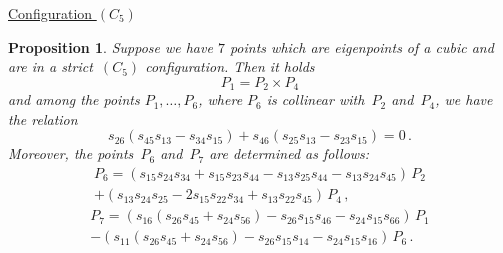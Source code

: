 \documentclass[a4paper, 11pt, reqno]{amsart}
\theoremstyle{plain}
\newtheorem{prop}[lemma]{Proposition}
\theoremstyle{definition}
\begin{document}
\underline{Configuration $(C_5)$}
\begin{prop}
\label{proposition:condition_5}
Suppose we have $7$ points which are eigenpoints of a cubic and are in a strict~$(C_5)$ configuration.
Then it holds
%
\[
  P_1 = P_2 \times P_4 
\]
%
and among the points $P_1, \dots, P_6$, where $P_6$ is collinear with~$P_2$ and~$P_4$, we have the relation
%
\begin{equation}
\label{cndC5}
  s_{26}(s_{45}s_{13}-s_{34}s_{15})+s_{46}(s_{25}s_{13}-s_{23}s_{15}) = 0 \,.
\end{equation}
%
Moreover, the points~$P_6$ and~$P_7$ are determined as follows:
%
\begin{equation}
\label{p6formula}
\begin{multlined}
  P_6 = (s_{15}s_{24}s_{34}+s_{15}s_{23}s_{44} -s_{13}s_{25}s_{44} -s_{13}s_{24}s_{45}) \, P_2 \\ + (s_{13}s_{24}s_{25}-2s_{15}s_{22}s_{34}+s_{13}s_{22}s_{45}) \, P_4 \,, 
\end{multlined}
\end{equation}
%
\begin{equation}
\label{p7formula}
\begin{multlined}
  P_7 = (s_{16}(s_{26}s_{45}+s_{24}s_{56})-s_{26}s_{15}s_{46}-s_{24}s_{15}s_{66}) \, P_1 \\
  - (s_{11}(s_{26}s_{45}+s_{24}s_{56})-s_{26}s_{15}s_{14}-s_{24}s_{15}s_{16}) \, P_6 \,.
\end{multlined}
\end{equation}
%
\end{prop}
\end{document}
